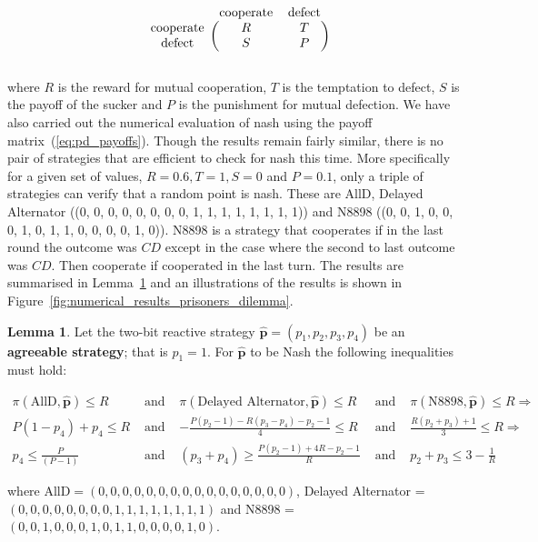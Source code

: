 \documentclass{article}
\theoremstyle{definition}
\newtheorem{lemma}[theorem]{Lemma}
\begin{document}
\begin{equation}\label{eq:pd_payoffs}
  \begin{blockarray}{ccc}
      & \text{cooperate} & \text{defect} \\
      \begin{block}{c(cc)}
          \text{cooperate} & R & T \\
          \text{defect} & S & P \\
      \end{block}
  \end{blockarray}
\end{equation}

where \(R\) is the reward for mutual cooperation, \(T\) is the temptation to
defect, \(S\) is the payoff of the sucker and \(P\) is the punishment for mutual
defection. We have also carried out the numerical evaluation of nash using the
payoff matrix~(\ref{eq:pd_payoffs}). Though the results remain fairly similar,
there is no pair of strategies that are efficient to check for nash this time.
More specifically for a given set of values, \(R=0.6, T=1, S=0\) and \(P=0.1\),
only a triple of strategies can verify that a random point is nash. These are
AllD, Delayed Alternator ((0, 0, 0, 0, 0, 0, 0, 0, 1, 1, 1, 1, 1, 1, 1, 1)) and
N8898 ((0, 0, 1, 0, 0, 0, 1, 0, 1, 1, 0, 0, 0, 0, 1, 0)). N8898 is a strategy
that cooperates if in the last round the outcome was \(CD\) except in the case
where the second to last outcome was \(CD\). Then cooperate if cooperated in the
last turn. The results are summarised in Lemma~\ref{lemma:nash_from_numerical_results_pd} and an illustrations of
the results is shown in Figure~\ref{fig:numerical_results_prisoners_dilemma}.

\begin{lemma}\label{lemma:nash_from_numerical_results_pd}
  Let the two-bit reactive strategy \(\mathbf{\hat{p}} = (p_{1}, p_{2}, p_{3}, p_{4})\) be an \textbf{agreeable
  strategy}; that is \(p_1 = 1\). For \(\mathbf{\hat{p}}\) to be Nash the
  following inequalities must hold:
  
  \begin{align*}
    \pi(\text{AllD}, \mathbf{\hat{p}}) \leq R & \text{ and } & \pi(\text{Delayed Alternator}, \mathbf{\hat{p}}) \leq R & \text{ and } & \pi(\text{N8898}, \mathbf{\hat{p}}) \leq R \Rightarrow \\
    P (1 - p_{4}) + p_{4}  \leq R & \text{ and }  & - \frac{P (p_{2} - 1) - R (p_{3} - p_{4}) - p_{2} - 1}{4} \leq R  & \text{ and } & \frac{R (p_{2} + p_{3}) + 1}{3} \leq R \Rightarrow \\
    p_4 \leq \frac{P}{(P - 1)} & \text{ and } & (p_3 + p_4) \geq \frac{P  (p_2 - 1) + 4  R - p_2 - 1}{R} & \text{ and }  &  p_2 + p_3 \leq 3 - \frac{1}{R}
  \end{align*}
  
  where AllD\(=(0, 0, 0, 0, 0, 0, 0, 0, 0, 0, 0, 0, 0, 0, 0, 0)\),
  Delayed Alternator = \((0, 0, 0, 0, 0, 0, 0, 0, 1, 1, 1, 1, 1, 1, 1, 1)\) and
  N8898 = \((0, 0, 1, 0, 0, 0, 1, 0, 1, 1, 0, 0, 0, 0, 1, 0)\).
  \end{lemma}
\end{document}
